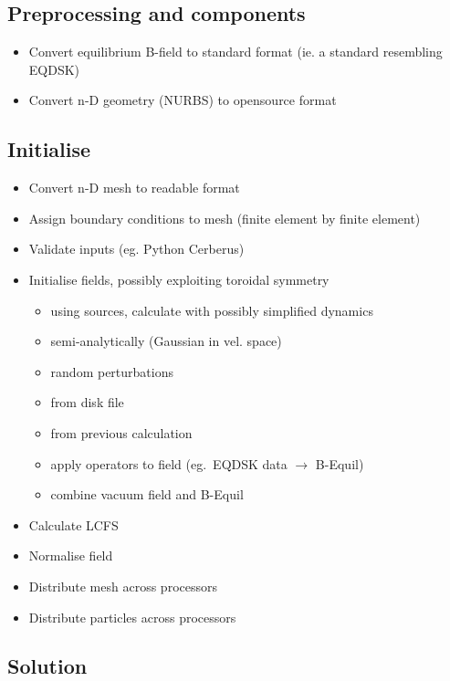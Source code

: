 \subsection{Preprocessing and
components}\label{preprocessing-and-components}

\begin{itemize}
\item
  Convert equilibrium B-field to standard format (ie. a standard
  resembling EQDSK)
\item
  Convert n-D geometry (NURBS) to opensource format
\end{itemize}

\subsection{Initialise}\label{sec:initialise}

\begin{itemize}
\item
  Convert n-D mesh to readable format
\item
  Assign boundary conditions to mesh (finite element by finite element)
\item
  Validate inputs (eg. Python Cerberus)
\item
  Initialise fields, possibly exploiting toroidal symmetry

  \begin{itemize}
  \item
    using sources, calculate with possibly simplified dynamics
  \item
    semi-analytically (Gaussian in vel. space)
  \item
    random perturbations
  \item
    from disk file
  \item
    from previous calculation
  \item
    apply operators to field (eg.\ EQDSK data \(\rightarrow\) B-Equil)
  \item
    combine vacuum field and B-Equil
  \end{itemize}
\item
  Calculate LCFS
\item
  Normalise field
\item
  Distribute mesh across processors
\item
  Distribute particles across processors
\end{itemize}

\subsection{Solution}\label{sec:solution}

